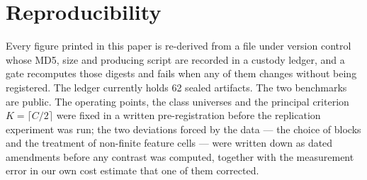 \section{Reproducibility}
\label{sec:appendix}

Every figure printed in this paper is re-derived from a file under version control whose MD5,
size and producing script are recorded in a custody ledger, and a gate recomputes those digests
and fails when any of them changes without being registered. The ledger currently holds
\num{62} sealed artifacts. The two benchmarks are public. The operating points, the class
universes and the principal criterion $K = \lceil C/2 \rceil$ were fixed in a written
pre-registration before the replication experiment was run; the two deviations forced by the data
--- the choice of blocks and the treatment of non-finite feature cells --- were written down as
dated amendments before any contrast was computed, together with the measurement error in our own
cost estimate that one of them corrected.
